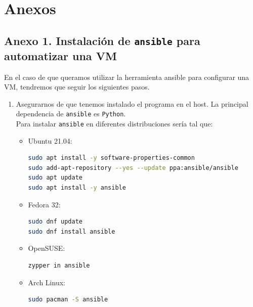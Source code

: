 \documentclass[12pt]{article}
\begin{document}
	\pagebreak
	
	\pagebreak
	\section*{Anexos}
	\subsection*{Anexo 1. Instalación de \texttt{ansible} para automatizar una VM}
	\noindent En el caso de que queramos utilizar la herramienta ansible para configurar una VM, tendremos que seguir los siguientes pasos.
	\begin{enumerate}
		\item Asegurarnos de que tenemos instalado el programa en el host. La principal dependencia de \texttt{ansible} es \texttt{Python}. \\
		Para instalar \texttt{ansible} en diferentes distribuciones sería tal que:
		\begin{itemize}
			\item Ubuntu 21.04:
			\begin{lstlisting}[language=Bash, caption={Instalación \texttt{ansible} en Ubuntu}]
sudo apt install -y software-properties-common
sudo add-apt-repository --yes --update ppa:ansible/ansible
sudo apt update
sudo apt install -y ansible
			\end{lstlisting}
			
			\item Fedora 32:
			\begin{lstlisting}[language=Bash, caption={Instalación \texttt{ansible} en Fedora}]
sudo dnf update
sudo dnf install ansible
			\end{lstlisting}
			
			\item OpenSUSE:
			\begin{lstlisting}[language=Bash, caption={Instalación \texttt{ansible} en OpenSUSE}]
zypper in ansible
			\end{lstlisting}
			
			\item Arch Linux:
			\begin{lstlisting}[language=Bash, caption={Instalación \texttt{ansible} en Arch Linux}]
sudo pacman -S ansible
			\end{lstlisting} 
		\end{itemize}
		

\end{enumerate}
\end{document}
